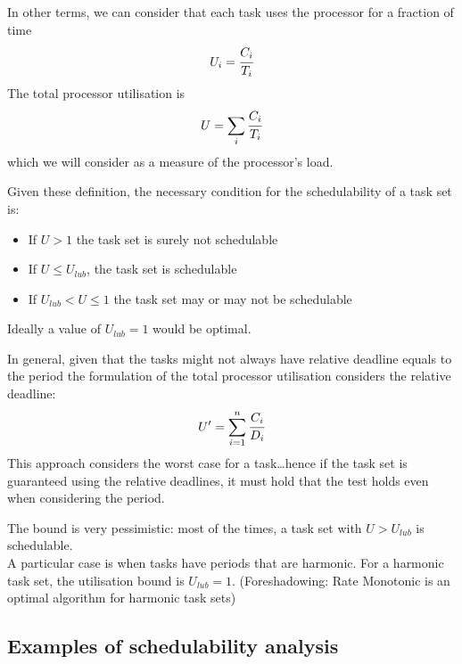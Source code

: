 In other terms, we can consider that each task uses the processor for a fraction of time 
\[U_i = \cfrac{C_i}{T_i}\]
The total processor utilisation is
\[U = \sum_i \cfrac{C_i}{T_i}\]
which we will consider as a measure of the processor's load.

Given these definition, the necessary condition for the schedulability of a task set is:
\begin{itemize}
    \item If $U>1$ the task set is surely not schedulable
    \item If $U\le U_{lub}$, the task set is schedulable
    \item If $U_{lub}<U \le 1$ the task set may or may not be schedulable
\end{itemize}
Ideally a value of $U_{lub} = 1$ would be optimal.

In general, given that the tasks might not always have relative deadline equals to the period the formulation of the total processor utilisation considers the relative deadline:
\[U' = \sum_{i=1}^n \cfrac{C_i}{D_i}\]
This approach considers the worst case for a task\dots hence if the task set is guaranteed using the relative deadlines, it must hold that the test holds even when considering the period.

The bound is very pessimistic: most of the times, a task set with $U>U_{lub}$ is schedulable.\\
A particular case is when tasks have periods that are harmonic.
For a harmonic task set, the utilisation bound is $U_{lub} = 1$.
(Foreshadowing: Rate Monotonic is an optimal algorithm for harmonic task sets)

\subsection{Examples of schedulability analysis}
